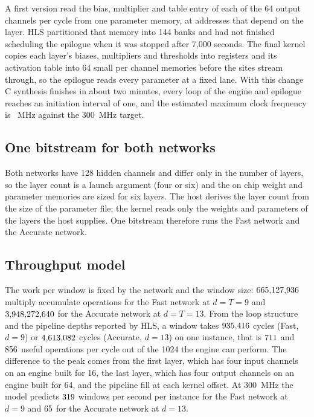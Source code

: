 A first version read the bias, multiplier and table entry of each of the 64 output channels per cycle from one
parameter memory, at addresses that depend on the layer. HLS partitioned that memory into 144 banks and had not finished
scheduling the epilogue when it was stopped after 7{,}000 seconds. The final kernel copies each layer's biases, multipliers and thresholds
into registers and its activation table into 64 small per channel memories before the sites stream through, so the
epilogue reads every parameter at a fixed lane. With this change C synthesis finishes in about two minutes, every
loop of the engine and epilogue reaches an initiation interval of one, and the estimated maximum clock frequency is
\NumHlsFmax{}~MHz against the 300~MHz target.

\subsection{One bitstream for both networks}

Both networks have 128 hidden channels and differ only in the number of layers, so the layer count is a launch
argument (four or six) and the on chip weight and parameter memories are sized for six layers. The host derives the
layer count from the size of the parameter file; the kernel reads only the weights and parameters of the layers the
host supplies. One bitstream therefore runs the Fast network and the Accurate network.

\subsection{Throughput model}

The work per window is fixed by the network and the window size: $665{,}127{,}936$ multiply accumulate operations for the
Fast network at $d=T=9$ and $3{,}948{,}272{,}640$ for the Accurate network at $d=T=13$. From the loop structure and the
pipeline depths reported by HLS, a window takes $935{,}416$ cycles (Fast, $d=9$) or $4{,}613{,}082$ cycles
(Accurate, $d=13$) on one instance, that is $711$ and $856$ useful operations per cycle
out of the 1024 the engine can perform. The difference to the peak comes from the first layer, which has four input
channels on an engine built for 16, the last layer, which has four output channels on an engine built for 64, and the
pipeline fill at each kernel offset. At 300~MHz the model predicts $319$ windows per second per instance for
the Fast network at $d=9$ and $65$ for the Accurate network at $d=13$.


